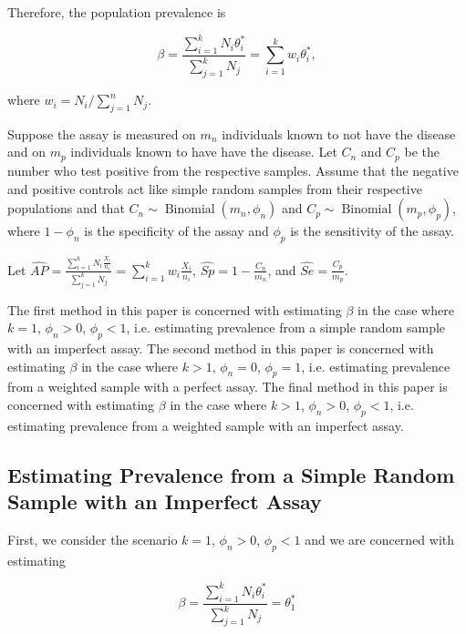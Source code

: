 \documentclass[AMA,STIX1COL]{WileyNJD-v2}
\begin{document}
Therefore, the population prevalence is 

\begin{equation}
    \beta = \frac{\sum_{i=1}^k N_i \theta_i^*}{\sum_{j=1}^k N_j} = \sum_{i=1}^k w_i \theta_i^*,
\end{equation}

where \( w_i = N_i / \sum_{j=1}^n N_j \).

Suppose the assay is measured on \( m_n \) individuals known to not have the disease and on \( m_p \) individuals known to have have the disease.
Let \( C_n \) and \( C_p \) be the number who test positive from the respective samples.
Assume that the negative and positive controls act like simple random samples from their respective populations and that \( C_n \sim \operatorname{Binomial}(m_n, \phi_n) \) and \( C_p \sim \operatorname{Binomial}(m_p, \phi_p) \), where \( 1 - \phi_n \) is the specificity of the assay and \( \phi_p \) is the sensitivity of the assay.

Let \( \widehat{AP} = \frac{\sum_{i=1}^k N_i \frac{X_i}{n_i}}{\sum_{j=1}^k N_j} = \sum_{i=1}^k w_i \frac{X_i}{n_i} \), \( \widehat{Sp} = 1 - \frac{C_n}{m_n} \), and \( \widehat{Se} = \frac{C_p}{m_p} \).

The first method in this paper is concerned with estimating \( \beta \) in the case where \( k = 1 \), \( \phi_n > 0 \), \( \phi_p < 1 \), i.e. estimating prevalence from a simple random sample with an imperfect assay.
The second method in this paper is concerned with estimating \( \beta \) in the case where \( k > 1 \), \( \phi_n = 0 \), \( \phi_p = 1 \), i.e. estimating prevalence from a weighted sample with a perfect assay.
The final method in this paper is concerned with estimating \( \beta \) in the case where \( k > 1 \), \( \phi_n > 0 \), \( \phi_p < 1 \), i.e. estimating prevalence from a weighted sample with an imperfect assay.

\subsection{Estimating Prevalence from a Simple Random Sample with an Imperfect Assay}

First, we consider the scenario \( k = 1 \), \( \phi_n > 0 \), \( \phi_p < 1 \) and we are concerned with estimating 

\begin{equation}
    \beta = \frac{\sum_{i=1}^k N_i \theta_i^*}{\sum_{j=1}^k N_j} = \theta_1^*
\end{equation}
\end{document}
